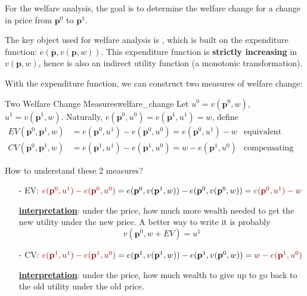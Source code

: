 For the welfare analysis, the goal is to determine the welfare change for a change in price from $\mathbf{p}^0$ to $\mathbf{p}^1$.

The key object used for welfare analysis is , which is built on the expenditure function: $e(\bar{\mathbf{p}},v(\mathbf{p},w))$. This expenditure function is \textbf{strictly increasing} in $v(\mathbf{p},w)$, hence is also an indirect utility function (a monotonic transformation).

With the expenditure function, we can construct two measures of welfare change:
\begin{definition}{Two Welfare Change Measures}{welfare_change}
    Let $u^0 = v(\mathbf{p}^0,w)$, $u^1 = v(\mathbf{p}^1,w)$. Naturally, $e(\mathbf{p}^0,u^0)=e(\mathbf{p}^1,u^1)=w$, define
    \begin{align*}
        EV(\mathbf{p}^0,\mathbf{p}^1,w) &=e(\mathbf{p}^0,u^1)-e(\mathbf{p}^0,u^0)=e(\mathbf{p}^0,u^1)-w & \text{equivalent variation}\\
        CV(\mathbf{p}^0,\mathbf{p}^1,w) &=e(\mathbf{p}^1,u^1)-e(\mathbf{p}^1,u^0)=w-e(\mathbf{p}^1,u^0) & \text{compensating variation}
    \end{align*}
\end{definition}

How to understand these 2 measures?

\begin{itemize}
    \item[-] EV: ${\color{red!55!black}e(\mathbf{p}^0,u^1)-e(\mathbf{p}^0,u^0)} = e(\mathbf{p}^0,v(\mathbf{p}^1,w))-e(\mathbf{p}^0,v(\mathbf{p}^0,w)) = {\color{red!55!black}e(\mathbf{p}^0,u^1)-w}$
    
    \underline{\textbf{interpretation}}: under the  price, how much more wealth needed to get the new utility under the new price. A better way to write it is probably
    $$
    v \left(\mathbf{p}^0, w+EV \right)=u^1
    $$
    
    \item[-] CV: ${\color{red!55!black}e(\mathbf{p}^1,u^1)-e(\mathbf{p}^1,u^0)} = e(\mathbf{p}^1,v(\mathbf{p}^1,w))-e(\mathbf{p}^1,v(\mathbf{p}^0,w)) = {\color{red!55!black}w- e(\mathbf{p}^1,u^0)}$
    
    \underline{\textbf{interpretation}}: under the  price, how much wealth to give up to go back to the old utility under the old price.
\end{itemize}